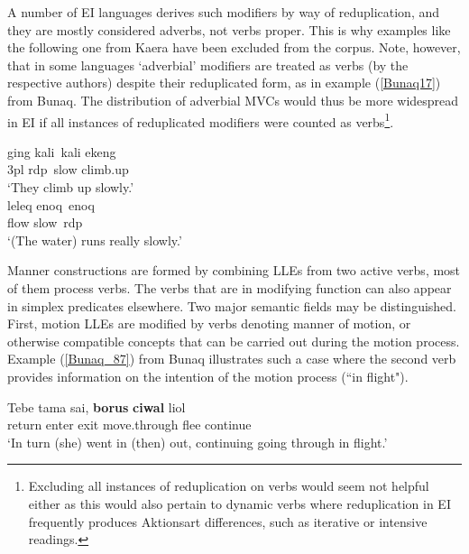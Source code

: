 A number of EI languages derives such modifiers by way of reduplication, and they are mostly considered adverbs, not verbs proper. This is why examples like the following one from Kaera have been excluded from the corpus. Note, however, that in some languages `adverbial' modifiers are treated as verbs (by the respective authors) despite their reduplicated form, as in example (\ref{Bunaq17}) from Bunaq. The distribution of adverbial MVCs would thus be more widespread in EI if all instances of reduplicated modifiers were counted as verbs\footnote{Excluding all instances of reduplication on verbs would seem not helpful either as this would also pertain to dynamic verbs where reduplication in EI frequently produces Aktionsart differences, such as iterative or intensive readings.}.

\ea \label{}
\gll ging kali~kali ekeng \\
3\acs{pl} \acs{rdp}~slow climb.up \\
\glft `They climb up slowly.' \\ 
\z
\xe
\ea \label{Bunaq17}
\gll leleq enoq~enoq \\
flow slow~\acs{rdp} \\
\glft `(The water) runs really slowly.' \\ 
\z
\xe

Manner constructions are formed by combining LLEs from two active verbs, most of them process verbs. The verbs that are in modifying function can also appear in simplex predicates elsewhere. Two major semantic fields may be distinguished. First, motion LLEs are modified by verbs denoting manner of motion, or otherwise compatible concepts that can be carried out during the motion process. Example (\ref{Bunaq_87}) from Bunaq illustrates such a case where the second verb provides information on the intention of the motion process (``in flight"). 

\ea \label{Bunaq_87}
\gll Tebe tama sai, \textbf{borus} \textbf{ciwal} liol \\
return enter exit move.through flee continue \\
\glft `In turn (she) went in (then) out, continuing going through in flight.’ \\ 
\z
\xe

